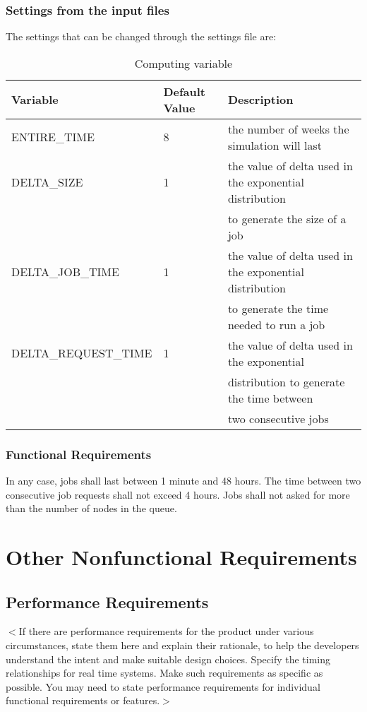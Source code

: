 \documentclass{scrreprt}
\begin{document}
\subsection{Settings from the input files}
The settings that can be changed through the settings file are:

\begin{table}[ht]
\centering
\caption{Computing variable}
\begin {tabular}{ l l l }
\toprule
Variable & Default Value & Description \\
\midrule
\midrule
ENTIRE_TIME & 8 & the number of weeks the simulation will last \\
DELTA_SIZE & 1 & the value of delta used in the exponential distribution \\&& to generate the size of a job\\
DELTA_JOB_TIME & 1 & the value of delta used in the exponential distribution\\&& to generate the time needed to run a job\\
DELTA_REQUEST_TIME & 1 & the value of delta used in the exponential \\&& distribution to generate the time between \\&& two consecutive jobs\\ 

\bottomrule
\end {tabular}
\end{table}


\subsection{Functional Requirements}
In any case, jobs shall last between 1 minute and 48 hours. The time between two consecutive job requests shall not exceed 4 hours. Jobs shall not asked for more than the number of nodes in the queue.

\chapter{Other Nonfunctional Requirements}

\section{Performance Requirements}
$<$If there are performance requirements for the product under various 
circumstances, state them here and explain their rationale, to help the 
developers understand the intent and make suitable design choices. Specify the 
timing relationships for real time systems. Make such requirements as specific 
as possible. You may need to state performance requirements for individual 
functional requirements or features.$>$
\end{document}
